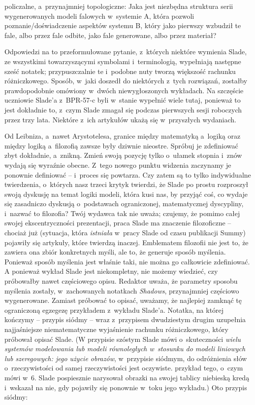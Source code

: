 \documentclass[oneside,polish,11pt,rmheadings]{mwbk}
\begin{document}
policzalne, a~przynajmniej topologiczne: Jaka jest niezbędna struktura serii wygenerowanych modeli falowych w~systemie A, która pozwoli poznanie/doświadczenie aspektów systemu B, który jako pierwszy wzbudził te fale, albo przez fale odbite, jako fale generowane, albo przez materiał? 

Odpowiedzi na to przeformułowane pytanie, z~których niektóre wymienia Slade, ze wszystkimi towarzyszącymi symbolami i~terminologią, wypełniają następne sześć notatek; przypuszczalnie te i~podobne nuty tworzą większość rachunku różniczkowego. Sposób, w~jaki doszedł do niektórych z~tych rozwiązań, zostałby prawdopodobnie omówiony w~dwóch niewygłoszonych wykładach. Na szczęście uczniowie Slade'a z~BPR-57-c byli w~stanie wypełnić wiele tutaj, ponieważ to jest dokładnie to, z~czym Slade zmagał się podczas pierwszych sesji roboczych przez trzy lata. Niektóre z~ich artykułów ukażą się w~przyszłych wydaniach. 

Od Leibniza, a~nawet Arystotelesa, granice między matematyką a~logiką oraz między logiką a~filozofią zawsze były dziwnie nieostre. Spróbuj je zdefiniować zbyt dokładnie, a~znikną. Zmień swoją pozycję tylko o~ułamek stopnia i~znów wydają się wyraźnie obecne. Z~tego nowego punktu widzenia zaczynamy je ponownie definiować -- i~proces się powtarza. Czy zatem są to tylko indywidualne twierdzenia, o~których nasz trzeci krytyk twierdzi, że Slade po prostu rozproszył swoją dyskusję na temat logiki modeli, która kusi nas, by przyjąć coś, co wydaje się zasadniczo dyskusją o~podstawach ograniczonej, matematycznej dyscypliny, i~nazwać to filozofia? Twój wydawca tak nie uważa; czujemy, że pomimo całej swojej ekscentryczności prezentacji, praca Slade ma znaczenie filozoficzne -- chociaż już (sytuacja, która \textit{istniała} w~pracy Slade od czasu publikacji Summy) pojawiły się artykuły, które twierdzą inaczej. Emblematem filozofii nie jest to, że zawiera ona zbiór konkretnych myśli, ale to, że generuje sposób myślenia. Ponieważ sposób myślenia jest właśnie taki, nie można go całkowicie zdefiniować. A ponieważ wykład Slade jest niekompletny, nie możemy wiedzieć, czy próbowałby nawet częściowego opisu. Redaktor uważa, że parametry sposobu myślenia zostały, w~zachowanych notatkach \textit{Shadows}, przynajmniej częściowo wygenerowane. Zamiast próbować to opisać, uważamy, że najlepiej zamknąć tę ograniczoną egzegezę przykładem z~wykładu Slade'a. Notatka, na której kończymy -- przypis siódmy -- wraz z~przypisem dwudziestym drugim uzupełnia najjaśniejsze niematematyczne wyjaśnienie rachunku różniczkowego, który próbował opisać Slade. (W przypisie szóstym Slade mówi o~skuteczności \textit{wielu systemów modelowania lub modeli równoległych w~stosunku do modeli liniowych lub szeregowych: jego użycie obrazów}, w~przypisie siódmym, do odróżnienia słów o~rzeczywistości od samej rzeczywistości jest oczywiste. przykład tego, o~czym mówi w~6. Slade pospiesznie narysował obrazki na swojej tablicy niebieską kredą i~wskazał na nie, gdy pojawiły się ponownie w~toku jego wykładu.) Oto przypis siódmy:
\end{document}
